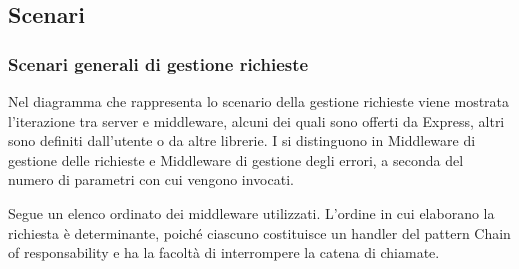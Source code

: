 \subsection{Scenari}

\subsubsection{Scenari generali di gestione richieste}
Nel diagramma che rappresenta lo scenario della gestione richieste viene mostrata l'iterazione tra server e middleware, alcuni dei quali sono offerti da Express, altri sono definiti dall'utente o da altre librerie. I  si distinguono in Middleware di gestione delle richieste e Middleware di gestione degli errori, a seconda del numero di parametri con cui vengono invocati.

Segue un elenco ordinato dei middleware utilizzati. L'ordine in cui elaborano la richiesta è determinante, poiché ciascuno costituisce un handler del pattern Chain of responsability e ha la facoltà di interrompere la catena di chiamate.

